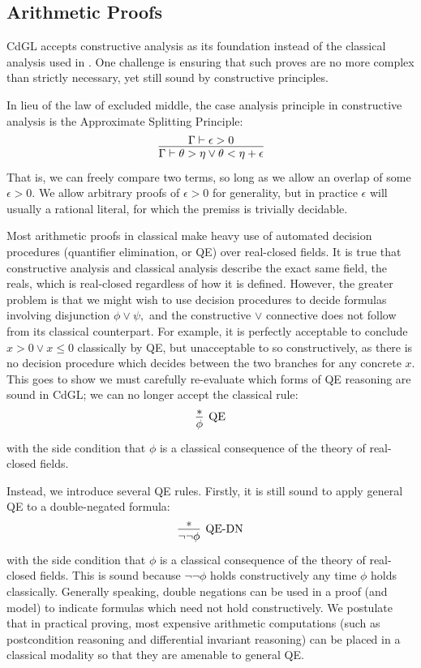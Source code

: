 \documentclass[12pt]{cmuthesis}
\theoremstyle{definition}
\theoremstyle{remark}
\newcommand{\CdGL}{\textsf{CdGL}\xspace}
\begin{document}
\subsection{Arithmetic Proofs}
\CdGL accepts constructive analysis as its foundation instead of the classical analysis used in \dGL.
One challenge is ensuring that such proves are no more complex than strictly necessary, yet still sound by constructive principles.

In lieu of the law of excluded middle, the case analysis principle in constructive analysis is the Approximate Splitting Principle:
\[\infer{\Gamma \vdash \theta > \eta \lor \theta < \eta + \epsilon}{\Gamma \vdash \epsilon > 0}\]
That is, we can freely compare two terms, so long as we allow an overlap of some $\epsilon > 0$.
We allow arbitrary proofs of $\epsilon > 0$ for generality, but in practice $\epsilon$ will usually a rational literal, for which the premiss is trivially decidable.

Most arithmetic proofs in classical \dGL make heavy use of automated decision procedures (quantifier elimination, or QE) over real-closed fields.
It is true that constructive analysis and classical analysis describe the exact same field, the reals, which is real-closed regardless of how it is defined.
However, the greater problem is that we might wish to use decision procedures to decide formulas involving disjunction $\phi \lor \psi,$ and the constructive $\lor$ connective does not follow from its classical counterpart.
For example, it is perfectly acceptable to conclude $x > 0 \lor x \leq 0$ classically by QE, but unacceptable to so constructively, as there is no decision procedure which decides between the two branches for any concrete $x$.
This goes to show we must carefully re-evaluate which forms of QE reasoning are sound in \CdGL; we can no longer accept the classical rule:
\[\infer[\text{QE}]{\phi}{*}\] with the side condition that $\phi$ is a classical consequence of the theory of real-closed fields.

Instead, we introduce several QE rules.
Firstly, it is still sound to apply general QE to a double-negated formula:
\[\infer[\text{QE-DN}]{\neg\neg\phi}{*}\] with the side condition that $\phi$ is a classical consequence of the theory of real-closed fields.
This is sound because $\neg\neg\phi$ holds constructively any time $\phi$ holds classically.
Generally speaking, double negations can be used in a proof (and model) to indicate formulas which need not hold constructively.
We postulate that in practical proving, most expensive arithmetic computations (such as postcondition reasoning and differential invariant reasoning) can be placed in a classical modality so that they are amenable to general QE.
\end{document}
